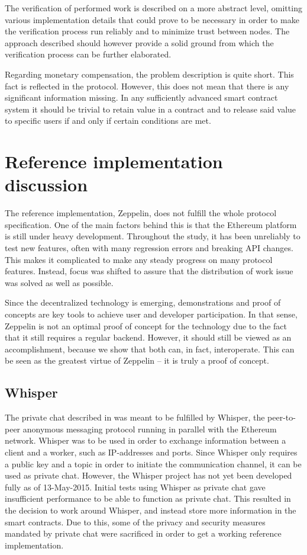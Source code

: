 The verification of performed work is described on a more abstract level, omitting various implementation details that could prove to be necessary in order to make the verification process run reliably and to minimize trust between nodes. The approach described should however provide a solid ground from which the verification process can be further elaborated.

Regarding monetary compensation, the problem description is quite short. This fact is reflected in the protocol. However, this does not mean that there is any significant information missing. In any sufficiently advanced smart contract system it should be trivial to retain value in a contract and to release said value to specific users if and only if certain conditions are met.

\section{Reference implementation discussion}
The reference implementation, Zeppelin, does not fulfill the whole protocol specification. One of the main factors behind this is that the Ethereum platform is still under heavy development. Throughout the study, it has been unreliably to test new features, often with many regression errors and breaking API changes. This makes it complicated to make any steady progress on many protocol features. Instead, focus was shifted to assure that the distribution of work issue was solved as well as possible.

Since the decentralized technology is emerging, demonstrations and proof of concepts are key tools to achieve user and developer participation. In that sense, Zeppelin is not an optimal proof of concept for the technology due to the fact that it still requires a regular backend. However, it should still be viewed as an accomplishment, because we show that both can, in fact, interoperate. This can be seen as the greatest virtue of Zeppelin -- it is truly a proof of concept.

\subsection{Whisper}
The private chat described in  was meant to be fulfilled by Whisper, the peer-to-peer anonymous messaging protocol running in parallel with the Ethereum network. Whisper was to be used in order to exchange information between a client and a worker, such as IP-addresses and ports. Since Whisper only requires a public key and a topic in order to initiate the communication channel, it can be used as private chat. However, the Whisper project has not yet been developed fully as of 13-May-2015. Initial tests using Whisper as private chat gave insufficient performance to be able to function as private chat. This resulted in the decision to work around Whisper, and instead store more information in the smart contracts. Due to this, some of the privacy and security measures mandated by private chat were sacrificed in order to get a working reference implementation.

